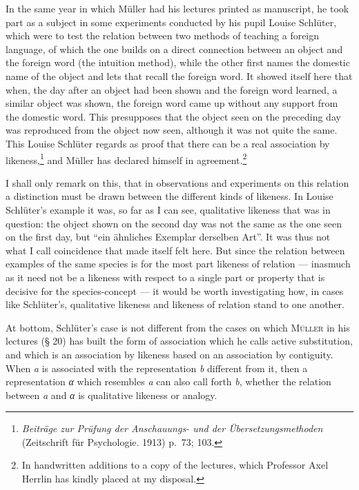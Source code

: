 \documentclass[12pt]{book}
\newcommand{\opage}[1]{\marginnote{\footnotesize\textit{[#1]}}}
\begin{document}
In the same year in which Müller had his lectures printed as manuscript, he took
part as a subject in some experiments conducted by his pupil Louise Schlüter,
which were to test the relation between two methods of teaching a foreign
language, of which the one builds on a direct connection between an object and
the foreign word (the intuition method), while the other first names the
domestic name of the object and lets that recall the foreign word. It showed
itself here that when, the day after an object had been shown and the foreign
word learned, a similar object was shown, the foreign word \opage{25}came up without any
support from the domestic word. This presupposes that the object seen on the
preceding day was reproduced from the object now seen, although it was not quite
the same. This Louise Schlüter regards as proof that there can be a real
association by likeness,\footnote{\textit{Beiträge zur Prüfung der Anschauungs-
und der Übersetzungsmethoden} (Zeitschrift für Psychologie. 1913) p.\ 73; 103.}
and Müller has declared himself in agreement.\footnote{In handwritten additions
to a copy of the lectures, which Professor Axel Herrlin has kindly placed at my
disposal.}

I shall only remark on this, that in observations and experiments on this
relation a distinction must be drawn between the different kinds of likeness. In
Louise Schlüter's example it was, so far as I can see, qualitative likeness that
was in question: the object shown on the second day was not the same as the one
seen on the first day, but ``ein ähnliches Exemplar derselben Art''. It was thus
not what I call coincidence that made itself felt here. But since the relation
between examples of the same species is for the most part likeness of relation
--- inasmuch as it need not be a likeness with respect to a single part or
property that is decisive for the species-concept --- it would be worth
investigating how, in cases like Schlüter's, qualitative likeness and likeness
of relation stand to one another.

At bottom, Schlüter's case is not different from the cases on which
\textsc{Müller} in his lectures (§ 20) has built the form of association which
he calls active substitution, and which is an association by likeness based on
an association by contiguity. When \textit{a} is associated with the
representation \textit{b} different from it, then a representation \textit{α}
which resembles \textit{a} can also call forth \textit{b}, whether the relation
between \textit{a} and \textit{α} is qualitative likeness or analogy.
\end{document}
